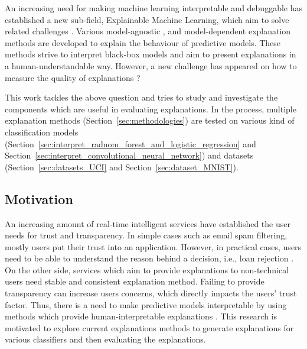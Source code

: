 \documentclass[english]{tktltiki2}
\theoremstyle{definition}
\theoremstyle{remark}
\begin{document}
An increasing need for making machine learning interpretable and debuggable has established a new sub-field, Explainable Machine Learning, which aim to solve related challenges \citep{adhikari2018example}. Various model-agnostic \citep{ribeiro2016should, lundberg2017unified}, and model-dependent \citep{ribeiro2016should} explanation methods are developed to explain the behaviour of predictive models. These methods strive to interpret black-box models and aim to present explanations in a human-understandable way. However, a new challenge has appeared on how to measure the quality of explanations \citep{lipton2016mythos, miller2018explanation, molnarinterpretable, murdoch2019interpretable}?

This work tackles the above question and tries to study and investigate the components which are useful in evaluating explanations. In the process, multiple explanation methods (Section~\ref{sec:methodologies}) are tested on various kind of classification models (Section~\ref{sec:interpret_radnom_forest_and_logistic_regression} and Section~\ref{sec:interpret_convolutional_neural_network}) and datasets (Section~\ref{sec:datasets_UCI} and Section~\ref{sec:dataset_MNIST}). 


\subsection{Motivation} %
An increasing amount of real-time intelligent services have established the user needs for trust and transparency. In simple cases such as email spam filtering, mostly users put their trust into an application. However, in practical cases, users need to be able to understand the reason behind a decision, i.e., loan rejection \citep{guidotti2018survey, lipton2016mythos, molnarinterpretable}. On the other side, services which aim to provide explanations to non-technical users need stable and consistent explanation method. Failing to provide transparency can increase users concerns, which directly impacts the users’ trust factor. Thus, there is a need to make predictive models interpretable by using methods which provide human-interpretable explanations \citep{guidotti2018survey, murdoch2019interpretable, gilpin2018explaining}. This research is motivated to explore current explanations methods to generate explanations for various classifiers and then evaluating the explanations. 
\end{document}
